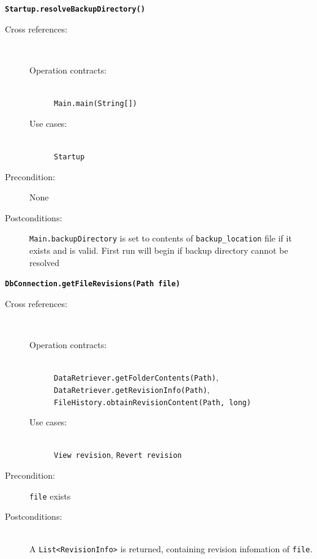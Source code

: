 \documentclass[12pt,a4paper]{article}
\begin{document}
\textbf{\texttt{Startup.resolveBackupDirectory()}}
\begin{description}
	\item[Cross references:] \hfill \vspace{-4ex}  \\
		\begin{description} 
		\item[Operation contracts:] \hfill \\
			\texttt{Main.main(String[])}
		\item[Use cases:] \hfill \\
			\texttt{Startup}
	\end{description}
	\item[Precondition:] None
	\item[Postconditions:] \texttt{Main.backupDirectory} is set to contents of \texttt{backup\_{}location} file if it exists and is valid. First run will begin if backup directory cannot be resolved
\end{description}

\vspace{0.75cm}

\textbf{\texttt{DbConnection.getFileRevisions(Path file)}}
	\begin{description}
	\item[Cross references:] \hfill \vspace{-4ex}  \\
		\begin{description} 
		\item[Operation contracts:] \hfill \\
			\texttt{DataRetriever.getFolderContents(Path)},\\
			\texttt{DataRetriever.getRevisionInfo(Path)},\\
			\texttt{FileHistory.obtainRevisionContent(Path, long)}
		\item[Use cases:] \hfill \\
			\texttt{View revision}, \texttt{Revert revision}
	\end{description}
	\item[Precondition:] \texttt{file} exists
	\item[Postconditions:] \hfill \\
	A \texttt{List<RevisionInfo>} is returned, containing revision infomation of \texttt{file}.
\end{description}

\vspace{0.75cm}
\end{document}
